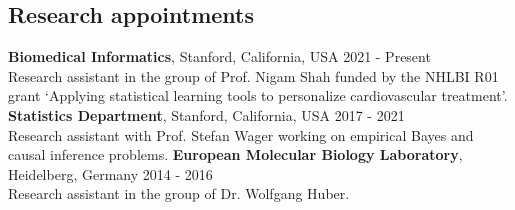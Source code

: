 \documentclass[margin,line]{res}
\begin{document}
\begin{resume}
\section{\sc Research appointments}
{\bf Biomedical Informatics},  Stanford, California, USA \hfill 2021 - Present\\
Research assistant in the group of Prof. Nigam Shah funded by the NHLBI R01 grant `Applying statistical learning tools to personalize cardiovascular treatment'.\\
{\bf Statistics Department},  Stanford, California, USA \hfill 2017 - 2021\\
Research assistant with Prof. Stefan Wager working on empirical Bayes and causal inference problems.
{\bf European Molecular Biology Laboratory},  Heidelberg, Germany \hfill 2014 - 2016\\
Research assistant in the group of Dr. Wolfgang Huber.


\end{resume}
\end{document}
